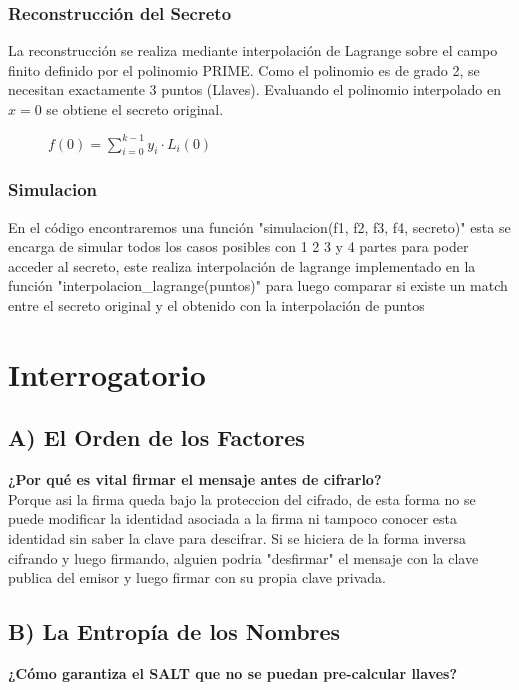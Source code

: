 \documentclass{article}
\begin{document}
\subsubsection{Reconstrucción del Secreto}

La reconstrucción se realiza mediante interpolación de Lagrange sobre el campo finito definido por el polinomio PRIME. Como el polinomio
es de grado 2, se necesitan exactamente 3 puntos (Llaves). Evaluando el polinomio interpolado en $x = 0$ se obtiene el secreto original.

\begin{figure}[ht]
    \centering
    $f(0) = \sum_{i=0}^{k-1} y_i \cdot L_i(0)$
\end{figure}


\subsubsection{Simulacion}

En el código encontraremos una función "simulacion(f1, f2, f3, f4, secreto)" esta se encarga de simular todos los casos posibles con 1 2 3 y 4
partes para poder acceder al secreto, este realiza interpolación de lagrange implementado en la función "interpolacion\_lagrange(puntos)"
para luego comparar si existe un match entre el secreto original y el obtenido con la interpolación de puntos


\section{Interrogatorio}

\subsection{A) El Orden de los Factores}
\textbf{¿Por qué es vital firmar el mensaje antes de cifrarlo?} \\

Porque asi la firma queda bajo la proteccion del cifrado, de esta forma no se puede modificar la identidad asociada a la firma ni tampoco
conocer esta identidad sin saber la clave para descifrar. Si se hiciera de la forma inversa cifrando y luego firmando, alguien podria "desfirmar"
el mensaje con la clave publica del emisor y luego firmar con su propia clave privada.

\subsection{B) La Entropía de los Nombres}
\textbf{¿Cómo garantiza el SALT que no se puedan pre-calcular llaves?} \\
\end{document}

